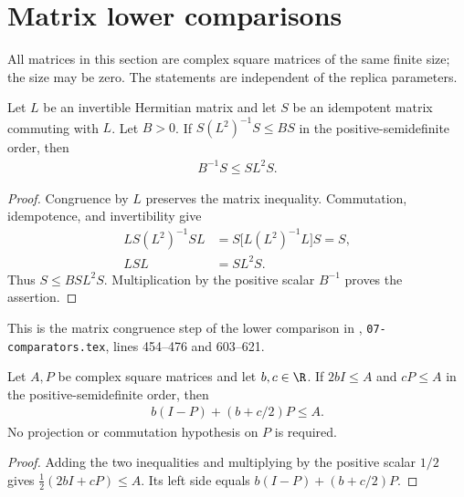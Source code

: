 \section{Matrix lower comparisons}

All matrices in this section are complex square matrices of the same finite
size; the size may be zero. The statements are independent of the replica
parameters.

\begin{theorem}
    \label{thm:area_law_compressed_inverse_floor}
    Let $L$ be an invertible Hermitian matrix and let $S$ be an
    idempotent matrix commuting with $L$. Let $B>0$. If
    $S(L^2)^{-1}S\le BS$ in the positive-semidefinite order, then
    \begin{align}
        B^{-1}S\le SL^2S.
    \end{align}
\end{theorem}

\begin{proof}
    Congruence by $L$ preserves the matrix inequality. Commutation,
    idempotence, and invertibility give
    \begin{align}
        LS(L^2)^{-1}SL
        &=S\bigl[L(L^2)^{-1}L\bigr]S=S,\\
        LSL&=SL^2S.
    \end{align}
    Thus $S\le BSL^2S$. Multiplication by the positive scalar
    $B^{-1}$ proves the assertion.
\end{proof}

This is the matrix congruence step of the lower comparison in
\cite{OpenAI2026AreaLaw}, \texttt{07-comparators.tex}, lines 454--476
and 603--621.

\begin{theorem}
    \label{thm:area_law_floor_pin}
    Let $A,P$ be complex square matrices and let $b,c\in\R$.
    If $2bI\le A$ and $cP\le A$ in the positive-semidefinite order, then
    \begin{align}
        b(I-P)+(b+c/2)P\le A.
    \end{align}
    No projection or commutation hypothesis on $P$ is required.
\end{theorem}

\begin{proof}
    Adding the two inequalities and multiplying by the positive scalar
    $1/2$ gives $\frac12(2bI+cP)\le A$. Its left side equals
    $b(I-P)+(b+c/2)P$.
\end{proof}

